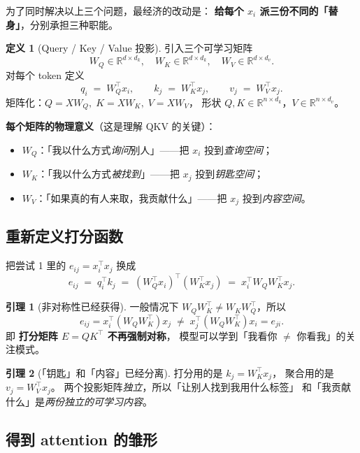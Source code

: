 \documentclass[11pt,a4paper]{ctexart}
\theoremstyle{definition}
\newtheorem{definitionx}{定义}
\newtheorem{lemma}{引理}
\theoremstyle{remark}
\newcommand{\R}{\mathbb{R}}
\begin{document}
为了同时解决以上三个问题，最经济的改动是：
\textbf{给每个 $x_i$ 派三份不同的「替身」}，分别承担三种职能。

\begin{definitionx}[Query / Key / Value 投影]
引入三个可学习矩阵
\[
  W_Q \in \R^{d \times d_k},\quad W_K \in \R^{d \times d_k},\quad W_V \in \R^{d \times d_v}.
\]
对每个 token 定义
\[
  q_i \;=\; W_Q^\top x_i,\qquad k_j \;=\; W_K^\top x_j,\qquad v_j \;=\; W_V^\top x_j.
\]
矩阵化：$Q = X W_Q,\; K = X W_K,\; V = X W_V$，
形状 $Q, K \in \R^{n \times d_k}$，$V \in \R^{n \times d_v}$。
\end{definitionx}

\textbf{每个矩阵的物理意义}（这是理解 QKV 的关键）：
\begin{itemize}
  \item $W_Q$：「我以什么方式\emph{询问}别人」——把 $x_i$ 投到\emph{查询空间}；
  \item $W_K$：「我以什么方式\emph{被找到}」——把 $x_j$ 投到\emph{钥匙空间}；
  \item $W_V$：「如果真的有人来取，我贡献什么」——把 $x_j$ 投到\emph{内容空间}。
\end{itemize}

\subsection{重新定义打分函数}

把尝试 1 里的 $e_{ij} = x_i^\top x_j$ 换成
\begin{equation}
  e_{ij} \;=\; q_i^\top k_j \;=\; (W_Q^\top x_i)^\top (W_K^\top x_j) \;=\; x_i^\top W_Q W_K^\top x_j.
  \label{eq:score}
\end{equation}

\begin{lemma}[非对称性已经获得]
一般情况下 $W_Q W_K^\top \neq W_K W_Q^\top$，所以
\[
  e_{ij} = x_i^\top (W_Q W_K^\top) x_j \;\neq\; x_j^\top (W_Q W_K^\top) x_i = e_{ji}.
\]
即 \textbf{打分矩阵 $E = QK^\top$ 不再强制对称}，
模型可以学到「我看你 $\neq$ 你看我」的关注模式。
\end{lemma}

\begin{lemma}[「钥匙」和「内容」已经分离]
打分用的是 $k_j = W_K^\top x_j$，
聚合用的是 $v_j = W_V^\top x_j$。
两个投影矩阵\emph{独立}，所以「让别人找到我用什么标签」
和「我贡献什么」是\emph{两份独立的可学习内容}。
\end{lemma}

\subsection{得到 attention 的雏形}
\end{document}
